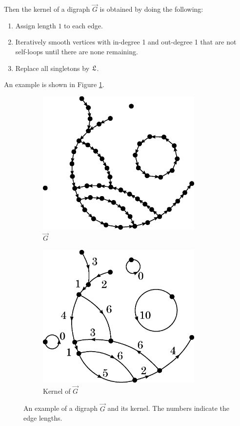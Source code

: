 Then the kernel of a digraph $\vec{G}$ is obtained by doing the following:
\begin{enumerate}
    \item Assign length $1$ to each edge.
    \item Iteratively smooth vertices with in-degree 1 and out-degree 1 that are not self-loops until there are none remaining.
    \item Replace all singletons by $\mathfrak L$.
\end{enumerate}
An example is shown in Figure \ref{fig:kernel}.
\begin{figure}[htbp]
    \centering
    \begin{subfigure}[htbp]{0.45\textwidth}
        \centering
        \includegraphics[width=0.90\textwidth]{Content/Pictures/Fig5a.eps}
        \caption{$\vec{G}$}
    \end{subfigure}
    \hfill
    \begin{subfigure}[htbp]{0.45\textwidth}
        \centering
        \includegraphics[width=0.90\textwidth]{Content/Pictures/Fig5b.eps}
        \caption{Kernel of $\vec{G}$}
    \end{subfigure}
    \caption{An example of a digraph $\vec{G}$ and its kernel. The numbers indicate the edge lengths.}
    \label{fig:kernel}
\end{figure}
